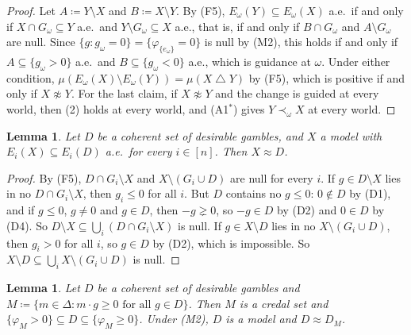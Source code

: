 \documentclass[11pt]{article}
\newtheorem{lemma}[theorem]{Lemma}
\theoremstyle{definition}
\newcommand{\sd}{\mathbin{\triangle}}
\newcommand{\gneqz}{\gneq 0}
\begin{document}
\begin{proof}
Let $A\coloneqq Y\setminus X$ and $B\coloneqq X\setminus Y$. By (F5), $E_\omega(Y)\subseteq E_\omega(X)$ a.e.\ if and only if $X\cap G_\omega\subseteq Y$ a.e.\ and $Y\setminus G_\omega\subseteq X$ a.e., that is, if and only if $B\cap G_\omega$ and $A\setminus G_\omega$ are null. Since $\{g:g_\omega=0\}=\{\varphi_{\{e_\omega\}}=0\}$ is null by (M2), this holds if and only if $A\subseteq\{g_\omega>0\}$ a.e.\ and $B\subseteq\{g_\omega<0\}$ a.e., which is guidance at $\omega$. Under either condition, $\mu(E_\omega(X)\setminus E_\omega(Y))=\mu(X\sd Y)$ by (F5), which is positive if and only if $X\not\approx Y$. For the last claim, if $X\not\approx Y$ and the change is guided at every world, then (2) holds at every world, and (A1$^*$) gives $Y\prec_\omega X$ at every world.
\end{proof}

\begin{lemma}\label{lem:minimal}
Let $D$ be a coherent set of desirable gambles, and $X$ a model with $E_i(X)\subseteq E_i(D)$ a.e.\ for every $i\in[n]$. Then $X\approx D$.
\end{lemma}

\begin{proof}
By (F5), $D\cap G_i\setminus X$ and $X\setminus(G_i\cup D)$ are null for every $i$. If $g\in D\setminus X$ lies in no $D\cap G_i\setminus X$, then $g_i\le0$ for all $i$. But $D$ contains no $g\le0$: $0\notin D$ by (D1), and if $g\le0$, $g\ne0$ and $g\in D$, then $-g\gneqz$, so $-g\in D$ by (D2) and $0\in D$ by (D4). So $D\setminus X\subseteq\bigcup_i(D\cap G_i\setminus X)$ is null. If $g\in X\setminus D$ lies in no $X\setminus(G_i\cup D)$, then $g_i>0$ for all $i$, so $g\in D$ by (D2), which is impossible. So $X\setminus D\subseteq\bigcup_iX\setminus(G_i\cup D)$ is null.
\end{proof}

\begin{lemma}\label{lem:coherent}
Let $D$ be a coherent set of desirable gambles and $M\coloneqq\{m\in\Delta:m\cdot g\ge0\text{ for all }g\in D\}$. Then $M$ is a credal set and $\{\varphi_M>0\}\subseteq D\subseteq\{\varphi_M\ge0\}$. Under (M2), $D$ is a model and $D\approx D_M$.
\end{lemma}
\end{document}
